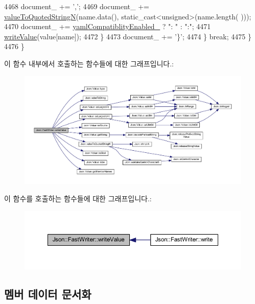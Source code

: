 \begin{DoxyCode}
4468         document\_ += \textcolor{charliteral}{','};
4469       document\_ += \hyperlink{namespace_json_a29aff81733b8fdaabf3f1acfc3ad339f}{valueToQuotedStringN}(name.data(), \textcolor{keyword}{static\_cast<}\textcolor{keywordtype}{unsigned}\textcolor{keyword}{>}(name.length(
      )));
4470       document\_ += \hyperlink{class_json_1_1_fast_writer_a4c4c1911179bf472d24492915b0e489a}{yamlCompatiblityEnabled\_} ? \textcolor{stringliteral}{": "} : \textcolor{stringliteral}{":"};
4471       \hyperlink{class_json_1_1_fast_writer_a2ef4a2ce13a341171f01f414f4fdd765}{writeValue}(value[name]);
4472     \}
4473     document\_ += \textcolor{charliteral}{'\}'};
4474   \} \textcolor{keywordflow}{break};
4475   \}
4476 \}
\end{DoxyCode}
이 함수 내부에서 호출하는 함수들에 대한 그래프입니다.\+:
\nopagebreak
\begin{figure}[H]
\begin{center}
\leavevmode
\includegraphics[width=350pt]{class_json_1_1_fast_writer_a2ef4a2ce13a341171f01f414f4fdd765_cgraph}
\end{center}
\end{figure}
이 함수를 호출하는 함수들에 대한 그래프입니다.\+:\nopagebreak
\begin{figure}[H]
\begin{center}
\leavevmode
\includegraphics[width=350pt]{class_json_1_1_fast_writer_a2ef4a2ce13a341171f01f414f4fdd765_icgraph}
\end{center}
\end{figure}


\subsection{멤버 데이터 문서화}
\mbox{\label{class_json_1_1_fast_writer_a5e08c44579db8704dba1ebe37d39fdba}} 
